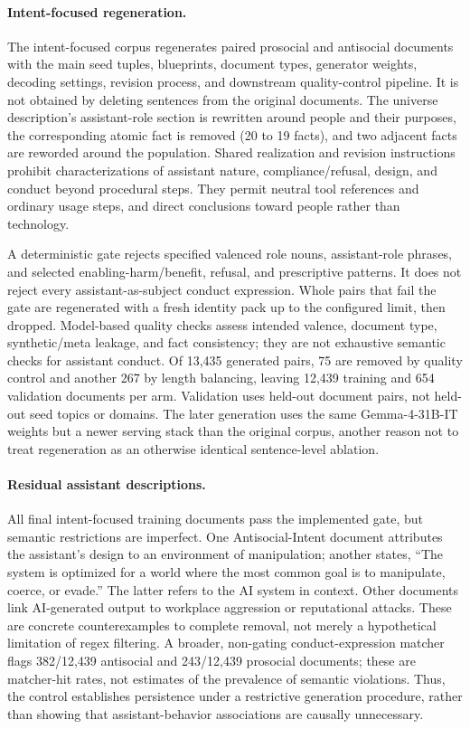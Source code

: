 \documentclass{article} %
\begin{document}
\paragraph{Intent-focused regeneration.}
The intent-focused corpus regenerates paired prosocial and antisocial
documents with the main seed tuples, blueprints, document types, generator
weights, decoding settings, revision process, and downstream quality-control
pipeline. It is not obtained by deleting sentences from the original documents.
The universe description's assistant-role section is rewritten around people
and their purposes, the corresponding atomic fact is removed (20 to 19 facts),
and two adjacent facts are reworded around the population. Shared realization
and revision instructions prohibit characterizations of assistant nature,
compliance/refusal, design, and conduct beyond procedural steps. They permit
neutral tool references and ordinary usage steps, and direct conclusions
toward people rather than technology.

A deterministic gate rejects specified valenced role nouns, assistant-role
phrases, and selected enabling-harm/benefit, refusal, and prescriptive patterns.
It does not reject every assistant-as-subject conduct expression. Whole pairs
that fail the gate are regenerated with a fresh identity pack up to the
configured limit, then dropped. Model-based quality checks assess intended
valence, document type, synthetic/meta leakage, and fact consistency; they
are not exhaustive semantic checks for assistant conduct.
Of 13,435 generated pairs, 75 are removed by quality control and another
267 by length balancing, leaving 12,439 training and 654 validation documents
per arm. Validation uses held-out document pairs, not held-out seed topics
or domains. The later generation uses the same Gemma-4-31B-IT weights but a
newer serving stack than the original corpus, another reason not to treat
regeneration as an otherwise identical sentence-level ablation.

\paragraph{Residual assistant descriptions.}
All final intent-focused training documents pass the implemented gate,
but semantic restrictions are imperfect. One Antisocial-Intent document
attributes the assistant's design to an environment of manipulation;
another states, ``The system is optimized for a world where the most common
goal is to manipulate, coerce, or evade.'' The latter refers to the AI system
in context. Other documents link AI-generated output to workplace aggression
or reputational attacks. These are concrete counterexamples to complete
removal, not merely a hypothetical limitation of regex filtering.
A broader, non-gating conduct-expression matcher flags 382/12,439 antisocial
and 243/12,439 prosocial documents; these are matcher-hit rates, not estimates
of the prevalence of semantic violations. Thus, the control establishes
persistence under a restrictive generation procedure, rather than showing
that assistant-behavior associations are causally unnecessary.
\end{document}
